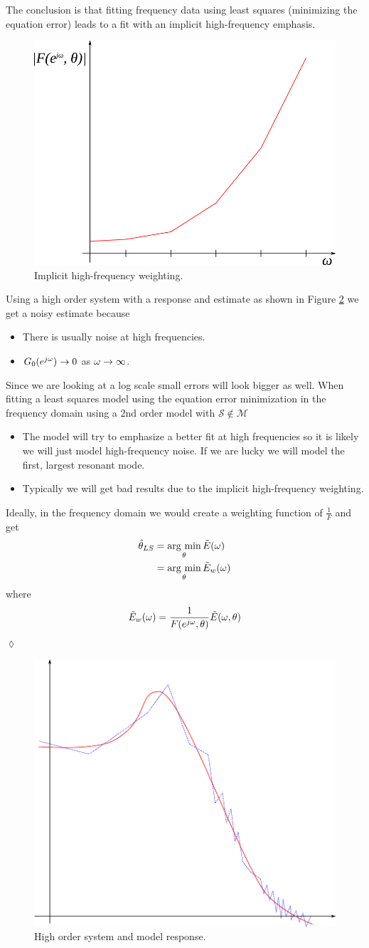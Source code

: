 The conclusion is that fitting frequency data using least squares (minimizing the equation error) leads to a fit with an implicit high-frequency emphasis.

\begin{figure}[ht!]
	\centering
	\includegraphics[width=.4\textwidth]{images/17poles}
	\caption{Implicit high-frequency weighting.}
	\label{fig:17poles}
\end{figure}

\begin{example}
Using a high order system with a response and estimate as shown in Figure \ref{fig:17model} we get a noisy estimate because
\begin{itemize}
\item There is usually noise at high frequencies.
\item $G_0(e^{j\omega})\to0$ as $\omega\to\infty$.
\end{itemize}
Since we are looking at a log scale small errors will look bigger as well. When fitting a least squares model using the equation error minimization in the frequency domain using a $2$nd order model with $\mathcal{S}\notin\mathcal{M}$
\begin{itemize}
\item The model will try to emphasize a better fit at high frequencies so it is likely we will just model high-frequency noise. If we are lucky we will model the first, largest resonant mode.
\item Typically we will get bad results due to the implicit high-frequency weighting.
\end{itemize}
Ideally, in the frequency domain we would create a weighting function of $\tfrac{1}{F}$ and get
\begin{align*}
\hat{\theta}_{LS} &= \mathop{\arg\,\min}\limits_\theta\tilde{E}(\omega) \\
&= \mathop{\arg\,\min}\limits_\theta\tilde{E}_w(\omega)
\end{align*}
where
$$\tilde{E}_w(\omega) = \frac{1}{F(e^{j\omega},\theta)}\tilde{E}(\omega,\theta)$$
$\lozenge$
\end{example}

\begin{figure}[ht!]
	\centering
	\includegraphics[width=.4\textwidth]{images/17model}
	\caption{High order system and model response.}
	\label{fig:17model}
\end{figure}

